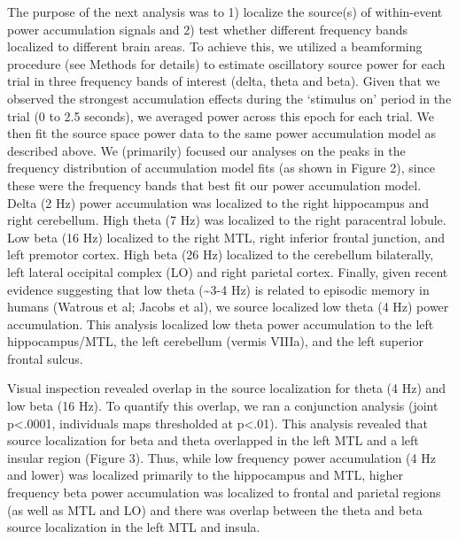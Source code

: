 The purpose of the next analysis was to 1) localize the source(s) of
within-event power accumulation signals and 2) test whether different
frequency bands localized to different brain areas. To achieve this, we
utilized a beamforming procedure (see Methods for details) to estimate
oscillatory source power for each trial in three frequency bands of
interest (delta, theta and beta). Given that we observed the strongest
accumulation effects during the `stimulus on' period in the trial (0 to
2.5 seconds), we averaged power across this epoch for each trial. We
then fit the source space power data to the same power accumulation
model as described above. We (primarily) focused our analyses on the
peaks in the frequency distribution of accumulation model fits (as shown
in Figure 2), since these were the frequency bands that best fit our
power accumulation model. Delta (2 Hz) power accumulation was localized
to the right hippocampus and right cerebellum. High theta (7 Hz) was
localized to the right paracentral lobule. Low beta (16 Hz) localized to
the right MTL, right inferior frontal junction, and left premotor
cortex. High beta (26 Hz) localized to the cerebellum bilaterally, left
lateral occipital complex (LO) and right parietal cortex. Finally, given
recent evidence suggesting that low theta (\textasciitilde{}3-4 Hz) is
related to episodic memory in humans (Watrous et al; Jacobs et al), we
source localized low theta (4 Hz) power accumulation. This analysis
localized low theta power accumulation to the left hippocampus/MTL, the
left cerebellum (vermis VIIIa), and the left superior frontal sulcus.

Visual inspection revealed overlap in the source localization for theta
(4 Hz) and low beta (16 Hz). To quantify this overlap, we ran a
conjunction analysis (joint p\textless{}.0001, individuals maps
thresholded at p\textless{}.01). This analysis revealed that source
localization for beta and theta overlapped in the left MTL and a left
insular region (Figure 3). Thus, while low frequency power accumulation
(4 Hz and lower) was localized primarily to the hippocampus and MTL,
higher frequency beta power accumulation was localized to frontal and
parietal regions (as well as MTL and LO) and there was overlap between
the theta and beta source localization in the left MTL and insula.


